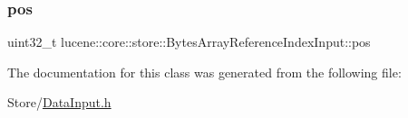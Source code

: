 \subsubsection{\texorpdfstring{pos}{pos}}
{\footnotesize\ttfamily uint32\+\_\+t lucene\+::core\+::store\+::\+Bytes\+Array\+Reference\+Index\+Input\+::pos\hspace{0.3cm}{\ttfamily [private]}}



The documentation for this class was generated from the following file\+:\begin{DoxyCompactItemize}
\item 
Store/\mbox{\hyperlink{DataInput_8h}{Data\+Input.\+h}}\end{DoxyCompactItemize}

